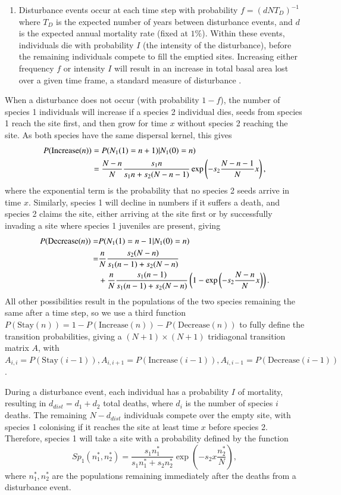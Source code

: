 \begin{enumerate}
\item Disturbance events occur at each time step with probability $f=(dNT_D)^{-1}$ where $T_D$ is the expected number of years between disturbance events, and $d$ is the expected annual mortality rate (fixed at $1\%$). Within these events, individuals die with probability $I$ (the intensity of the disturbance), before the remaining individuals compete to fill the emptied sites. Increasing either frequency $f$ or intensity $I$ will result in an increase in total basal area lost over a given time frame, a standard measure of disturbance \citep[e.g.][]{molino2001tree,peterson1997tornado}.
\end{enumerate}
When a disturbance does not occur (with probability $1-f$), the number of species 1 individuals will increase if a species 2 individual dies, seeds from species 1 reach the site first, and then grow for time $x$ without species 2 reaching the site. As both species have the same dispersal kernel, this gives
\begin{align}
\label{increase}
P(\text{Increase}(n))&=P(N_1(1)=n+1)|N_1(0)=n) \\
&=\frac{N-n}{N}\frac{s_1 n}{s_1 n +s_2(N-n-1)}\exp \left( -s_2 \frac{N-n-1}{N} x\right),\notag \end{align}
where the exponential term is the probability that no species 2 seeds arrive in time $x$. Similarly, species 1 will decline in numbers if it suffers a death, and species 2 claims the site, either arriving at the site first or by successfully invading a site where species 1 juveniles are present, giving
\begin{align}
\label{decrease}
P(\text{Decrease}(n))=&P(N_1(1)=n-1 | N_1(0)=n)  \\ 
=&\frac{n}{N}\frac{s_2 (N-n)}{s_1 (n-1) +s_2(N-n)} \notag \\
& + \frac{n}{N}\frac{s_1 (n-1)}{s_1 (n-1) +s_2(N-n)}\left(1-\exp \left( -s_2 \frac{N-n}{N} x\right)\right). \notag \end{align}
All other possibilities result in the populations of the two species remaining the same after a time step, so we use a third function $P(\text{Stay}(n))=1-P(\text{Increase}(n))-P(\text{Decrease}(n))$ to fully define the transition probabilities, giving a $(N+1) \times (N+1)$ tridiagonal transition matrix $A$, with $A_{i,i}=P(\text{Stay}(i-1)), A_{i,i+1}=P(\text{Increase}(i-1)), A_{i,i-1}=P(\text{Decrease}(i-1))$.

During a disturbance event, each individual has a probability $I$ of mortality, resulting in $d_{dist}=d_1+d_2$ total deaths, where $d_i$ is the number of species $i$ deaths. The remaining $N-d_{dist}$ individuals compete over the empty site, with species 1 colonising if it reaches the site at least time $x$ before species 2. Therefore, species 1 will take a site with a probability defined by the function
\begin{equation}
\label{sp1}
Sp_1(n_1^*,n_2^*)=\frac{s_1 n_1^*}{s_1n_1^*+s_2n_2^*}\exp \left(-s_2 x\frac{n_2^*}{N}\right),
\end{equation}
where $n_1^*,n_2^*$ are the populations remaining immediately after the deaths from a disturbance event.

